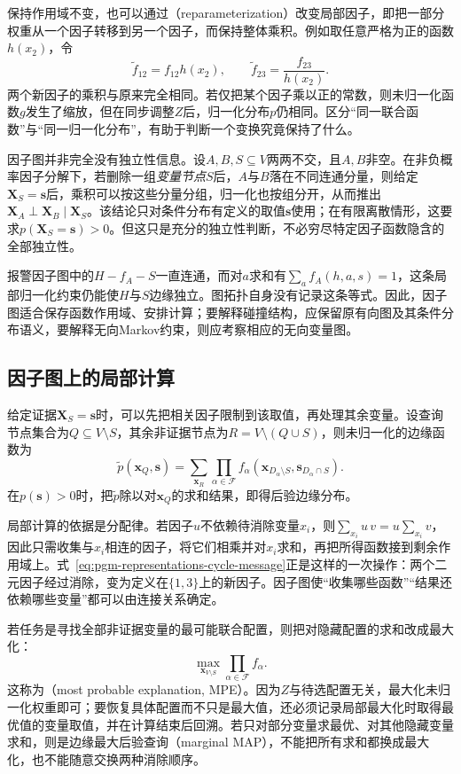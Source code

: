 保持作用域不变，也可以通过（reparameterization）改变局部因子，即把一部分权重从一个因子转移到另一个因子，而保持整体乘积。例如取任意严格为正的函数$h(x_2)$，令
\[
  \widetilde f_{12}=f_{12}h(x_2),\qquad
  \widetilde f_{23}=\frac{f_{23}}{h(x_2)}.
\]
两个新因子的乘积与原来完全相同。若仅把某个因子乘以正的常数，则未归一化函数$g$发生了缩放，但在同步调整$Z$后，归一化分布$p$仍相同。区分“同一联合函数”与“同一归一化分布”，有助于判断一个变换究竟保持了什么。

因子图并非完全没有独立性信息。设$A,B,S\subseteq V$两两不交，且$A,B$非空。在非负概率因子分解下，若删除一组\emph{变量节点}$S$后，$A$与$B$落在不同连通分量，则给定$\bm{X}_S=\bm{s}$后，乘积可以按这些分量分组，归一化也按组分开，从而推出$\bm{X}_A\perp\bm{X}_B\mid\bm{X}_S$。该结论只对条件分布有定义的取值$\bm{s}$使用；在有限离散情形，这要求$p(\bm{X}_S=\bm{s})>0$。但这只是充分的独立性判断，不必穷尽特定因子函数隐含的全部独立性。

报警因子图中的$H-f_A-S$一直连通，而对$a$求和有$\sum_a f_A(h,a,s)=1$，这条局部归一化约束仍能使$H$与$S$边缘独立。图拓扑自身没有记录这条等式。因此，因子图适合保存函数作用域、安排计算；要解释碰撞结构，应保留原有向图及其条件分布语义，要解释无向Markov约束，则应考察相应的无向变量图。

\subsection{因子图上的局部计算}
\label{sec:pgm-representations-local-computation}

给定证据$\bm{X}_S=\bm{s}$时，可以先把相关因子限制到该取值，再处理其余变量。设查询节点集合为$Q\subseteq V\setminus S$，其余非证据节点为$R=V\setminus(Q\cup S)$，则未归一化的边缘函数为
\begin{equation}
  \widetilde p(\bm{x}_Q,\bm{s})
  =\sum_{\bm{x}_R}
  \prod_{\alpha\in\mathcal{F}}
  f_\alpha(\bm{x}_{D_\alpha\setminus S},\bm{s}_{D_\alpha\cap S}).
  \label{eq:pgm-representations-marginal-query}
\end{equation}
在$p(\bm{s})>0$时，把$\widetilde p$除以对$\bm{x}_Q$的求和结果，即得后验边缘分布。

局部计算的依据是分配律。若因子$u$不依赖待消除变量$x_i$，则$\sum_{x_i}u\,v=u\sum_{x_i}v$，因此只需收集与$x_i$相连的因子，将它们相乘并对$x_i$求和，再把所得函数接到剩余作用域上。式~\eqref{eq:pgm-representations-cycle-message}正是这样的一次操作：两个二元因子经过消除，变为定义在$\{1,3\}$上的新因子。因子图使“收集哪些函数”“结果还依赖哪些变量”都可以由连接关系确定。

若任务是寻找全部非证据变量的最可能联合配置，则把对隐藏配置的求和改成最大化：
\[
  \max_{\bm{x}_{V\setminus S}}
  \prod_{\alpha\in\mathcal{F}}f_\alpha.
\]
这称为（most probable explanation, MPE）。因为$Z$与待选配置无关，最大化未归一化权重即可；要恢复具体配置而不只是最大值，还必须记录局部最大化时取得最优值的变量取值，并在计算结束后回溯。若只对部分变量求最优、对其他隐藏变量求和，则是边缘最大后验查询（marginal MAP），不能把所有求和都换成最大化，也不能随意交换两种消除顺序。

